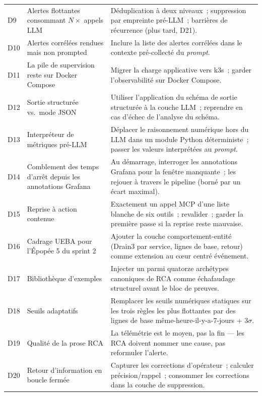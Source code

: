 \documentclass[11pt,a4paper,oneside]{report}
\begin{document}
\begin{longtable}{p{} p{} p{}}
D9  & Alertes flottantes consommant $N\times$ appels LLM
    & Déduplication à deux niveaux~; suppression par empreinte
      pré-LLM~; barrières de récurrence (plus tard, D21). \\
D10 & Alertes corrélées rendues mais non prompted
    & Inclure la liste des alertes corrélées dans le contexte
      pré-collecté du \emph{prompt}. \\
D11 & La pile de supervision reste sur Docker Compose
    & Migrer la charge applicative vers k3s~; garder
      l'observabilité sur Docker Compose. \\
D12 & Sortie structurée vs.\ mode JSON
    & Utiliser l'application du schéma de sortie structurée à la
      couche LLM~; reprendre en cas d'échec de l'analyse du
      schéma. \\
D13 & Interpréteur de métriques pré-LLM
    & Déplacer le raisonnement numérique hors du LLM dans un
      module Python déterministe~; passer les valeurs interprétées
      au \emph{prompt}. \\
D14 & Comblement des temps d'arrêt depuis les annotations Grafana
    & Au démarrage, interroger les annotations Grafana pour la
      fenêtre manquante~; les rejouer à travers le pipeline (borné
      par un écart maximal). \\
D15 & Reprise à action contenue
    & Exactement un appel MCP d'une liste blanche de six outils~;
      revalider~; garder la première passe si la reprise reste
      mauvaise. \\
D16 & Cadrage UEBA pour l'Épopée 5 du sprint 2
    & Ajouter la couche comportement-entité (Drain3 par service,
      lignes de base, retour) comme extension au c\oe{}ur centré
      événement. \\
D17 & Bibliothèque d'exemples
    & Injecter un parmi quatorze archétypes canoniques de RCA
      comme échafaudage structurel avant le bloc de preuves. \\
D18 & Seuils adaptatifs
    & Remplacer les seuils numériques statiques sur les trois
      règles les plus flottantes par des lignes de base
      même-heure-il-y-a-7-jours + $3\sigma$. \\
D19 & Qualité de la prose RCA
    & La télémétrie est le moyen, pas la fin --- les RCA doivent
      nommer une cause, pas reformuler l'alerte. \\
D20 & Retour d'information en boucle fermée
    & Capturer les corrections d'opérateur~; calculer
      précision/rappel~; consommer les corrections dans la couche
      de suppression. \\

\end{longtable}
\end{document}
